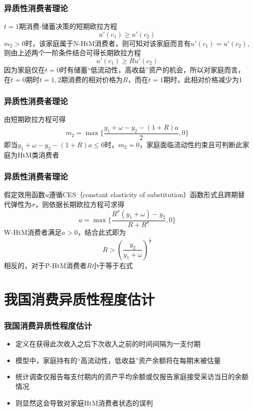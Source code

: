 \documentclass{beamer}
\begin{document}
\begin{frame}
\frametitle{异质性消费者理论}
$t=1$期消费-储蓄决策的短期欧拉方程
\begin{equation*}
u'(c_1) \geq u'(c_2)
\end{equation*}
$m_2>0$时，该家庭属于N-HtM消费者，则可知对该家庭而言有$u'(c_1)=u'(c_2)$,则由上述两个一阶条件结合可得长期欧拉方程
\begin{equation*}
u'(c_1) \geq Ru'(c_2)
\end{equation*}
因为家庭仅在$t=0$时有储蓄“低流动性，高收益”资产的机会，所以对家庭而言，在$t=0$期时$t=1,2$期消费的相对价格为$R$，而在$t=1$期时，此相对价格减少为1
\end{frame}

\begin{frame}
\frametitle{异质性消费者理论}
由短期欧拉方程可得
\begin{equation*}
m_2=\max \lbrace \frac{y_1+\omega-y_2-(1+R)a}{2},0 \rbrace
\end{equation*}
即当$y_1+\omega-y_2-(1+R)a \leq 0$时，$m_2=0$，家庭面临流动性约束且可判断此家庭为HtM类消费者
\end{frame}

\begin{frame}
\frametitle{异质性消费者理论}
假定效用函数$u$遵循CES（constant elasticity of substitution）函数形式且跨期替代弹性为$\sigma$，则依据长期欧拉方程可求得
\begin{equation*}
a=\max \lbrace \frac{R^\sigma (y_1+\omega)-y_2}{R+R^\sigma},0 \rbrace
\end{equation*}
W-HtM消费者满足$a>0$，结合此式即为
\begin{equation*}
R>(\frac{y_2}{y_1+\omega})^\frac{1}{\sigma}
\end{equation*}
相反的，对于P-HtM消费者$R$小于等于右式
\end{frame}

\section{我国消费异质性程度估计}

\begin{frame}
\frametitle{我国消费异质性程度估计}
\begin{itemize}
\item 定义在获得此次收入之后下次收入之前的时间间隔为一支付期
\item 模型中，家庭持有的“高流动性，低收益”资产余额将在每期末被估量
\item 统计调查仅报告每支付期内的资产平均余额或仅报告家庭接受采访当日的余额情况
\item 则显然这会导致对家庭HtM消费者状态的误判 
\end{itemize}
\end{frame}
\end{document}
